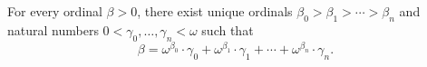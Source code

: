 For every ordinal $\beta > 0$, there exist unique ordinals $\beta_0 > \beta_1 > \cdots > \beta_n$ and natural numbers $0 < \gamma_0, \ldots, \gamma_n < \omega$ such that
$$\beta = \omega^{\beta_0} \cdot \gamma_0 + \omega^{\beta_1} \cdot \gamma_1 + \cdots + \omega^{\beta_n} \cdot \gamma_n.$$
